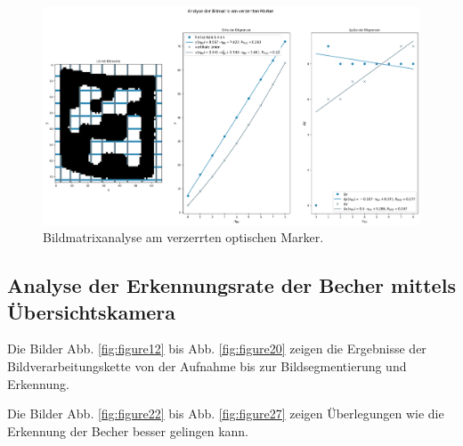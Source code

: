     
    \begin{figure}
        \caption[Bildmatrixanalyse]{\small Bildmatrixanalyse am verzerrten optischen Marker.}\label{fig:figure21}
        \includegraphics[width = \textwidth]{Bilder/cup6_analyse.png}
        \centering
    \end{figure}

    \clearpage
    
    \clearpage

    \subsection{Analyse der Erkennungsrate der Becher mittels Übersichtskamera}

    Die Bilder Abb. \ref{fig:figure12} bis Abb. \ref{fig:figure20} zeigen die Ergebnisse der Bildverarbeitungskette von der Aufnahme bis zur Bildsegmentierung und Erkennung.

    Die Bilder Abb. \ref{fig:figure22} bis Abb. \ref{fig:figure27} zeigen Überlegungen wie die Erkennung der Becher besser gelingen kann. 

